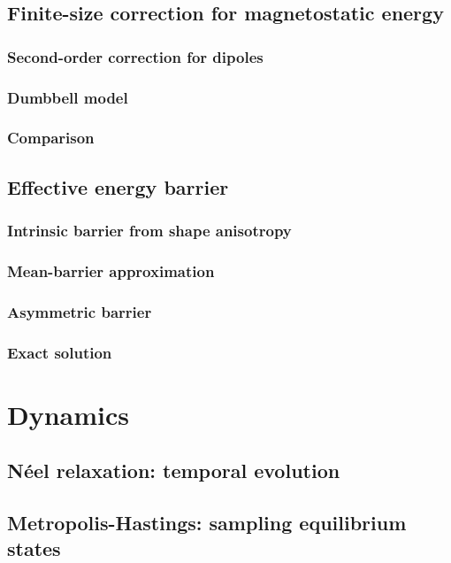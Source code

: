 \subsection{Finite-size correction for magnetostatic energy}
\subsubsection{Second-order correction for dipoles}
\subsubsection{Dumbbell model}
\subsubsection{Comparison}
\subsection{Effective energy barrier}
\subsubsection{Intrinsic barrier from shape anisotropy}
\subsubsection{Mean-barrier approximation} %
\subsubsection{Asymmetric barrier}
\subsubsection{Exact solution} %

\section{Dynamics}\label{sec:2:Dynamics}
\subsection{N\'eel relaxation: temporal evolution}
\subsection{Metropolis-Hastings: sampling equilibrium states}
